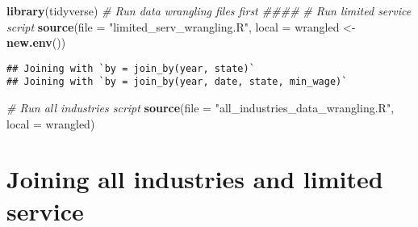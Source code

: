 \documentclass[
]{article}
\author{}
\date{\vspace{-2.5em}}
\newenvironment{Shaded}{\begin{snugshade}}{\end{snugshade}}
\newcommand{\AttributeTok}[1]{\textcolor[rgb]{0.13,0.29,0.53}{#1}}
\newcommand{\CommentTok}[1]{\textcolor[rgb]{0.56,0.35,0.01}{\textit{#1}}}
\newcommand{\DecValTok}[1]{\textcolor[rgb]{0.00,0.00,0.81}{#1}}
\newcommand{\FunctionTok}[1]{\textcolor[rgb]{0.13,0.29,0.53}{\textbf{#1}}}
\newcommand{\NormalTok}[1]{#1}
\newcommand{\OtherTok}[1]{\textcolor[rgb]{0.56,0.35,0.01}{#1}}
\newcommand{\SpecialCharTok}[1]{\textcolor[rgb]{0.81,0.36,0.00}{\textbf{#1}}}
\newcommand{\StringTok}[1]{\textcolor[rgb]{0.31,0.60,0.02}{#1}}
\begin{document}
\begin{Shaded}
\begin{Highlighting}[]
\FunctionTok{library}\NormalTok{(tidyverse)}
\CommentTok{\# Run data wrangling files first \#\#\#\#}
\CommentTok{\# Run limited service script}
\FunctionTok{source}\NormalTok{(}\AttributeTok{file =} \StringTok{"limited\_serv\_wrangling.R"}\NormalTok{, }\AttributeTok{local =}\NormalTok{ wrangled }\OtherTok{\textless{}{-}} \FunctionTok{new.env}\NormalTok{())}
\end{Highlighting}
\end{Shaded}

\begin{verbatim}
## Joining with `by = join_by(year, state)`
## Joining with `by = join_by(year, date, state, min_wage)`
\end{verbatim}

\begin{Shaded}
\begin{Highlighting}[]
\CommentTok{\# Run all industries script}
\FunctionTok{source}\NormalTok{(}\AttributeTok{file =} \StringTok{"all\_industries\_data\_wrangling.R"}\NormalTok{, }\AttributeTok{local =}\NormalTok{ wrangled)}
\end{Highlighting}
\end{Shaded}

\hypertarget{joining-all-industries-and-limited-service}{%
\section{Joining all industries and limited
service}\label{joining-all-industries-and-limited-service}}

\begin{Shaded}
\end{Shaded}
\end{document}
